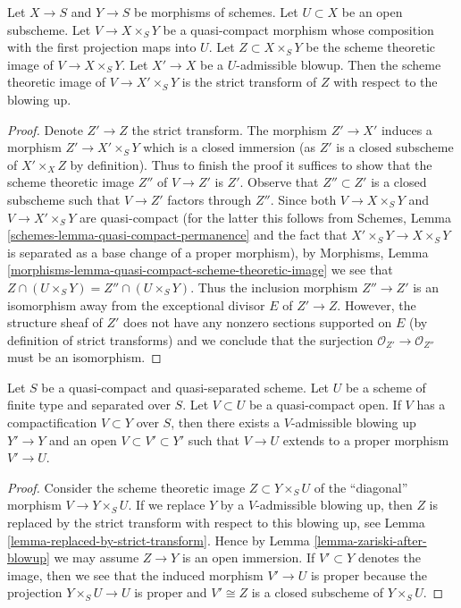 \begin{lemma}
\label{lemma-replaced-by-strict-transform}
Let $X \to S$ and $Y \to S$ be morphisms of schemes.
Let $U \subset X$ be an open subscheme.
Let $V \to X \times_S Y$ be a quasi-compact morphism
whose composition with the first projection maps into $U$.
Let $Z \subset X \times_S Y$ be the scheme theoretic image of
$V \to X \times_S Y$. Let $X' \to X$ be a $U$-admissible blowup.
Then the scheme theoretic image of $V \to X' \times_S Y$ is the
strict transform of $Z$ with respect to the blowing up.
\end{lemma}

\begin{proof}
Denote $Z' \to Z$ the strict transform. The morphism $Z' \to X'$
induces a morphism $Z' \to X' \times_S Y$ which is a closed immersion
(as $Z'$ is a closed subscheme of $X' \times_X Z$ by definition).
Thus to finish the proof it suffices to show that the scheme theoretic
image $Z''$ of $V \to Z'$ is $Z'$. Observe that $Z'' \subset Z'$
is a closed subscheme such that $V \to Z'$ factors through $Z''$.
Since both $V \to X \times_S Y$ and $V \to X' \times_S Y$ are
quasi-compact (for the latter this follows from Schemes, Lemma
\ref{schemes-lemma-quasi-compact-permanence}
and the fact that $X' \times_S Y \to X \times_S Y$ is separated
as a base change of a proper morphism), by Morphisms, Lemma
\ref{morphisms-lemma-quasi-compact-scheme-theoretic-image}
we see that $Z \cap (U \times_S Y) = Z'' \cap (U \times_S Y)$.
Thus the inclusion morphism $Z'' \to Z'$ is an isomorphism
away from the exceptional divisor $E$ of $Z' \to Z$. However, the
structure sheaf of $Z'$ does not have any nonzero sections supported
on $E$ (by definition of strict transforms) and we conclude that
the surjection $\mathcal{O}_{Z'} \to \mathcal{O}_{Z''}$
must be an isomorphism.
\end{proof}

\begin{lemma}
\label{lemma-compactification-dominates}
Let $S$ be a quasi-compact and quasi-separated scheme. Let $U$ be a
scheme of finite type and separated over $S$. Let $V \subset U$ be a
quasi-compact open. If $V$ has a compactification $V \subset Y$
over $S$, then there exists a $V$-admissible blowing up $Y' \to Y$ and an
open $V \subset V' \subset Y'$ such that $V \to U$
extends to a proper morphism $V' \to U$.
\end{lemma}

\begin{proof}
Consider the scheme theoretic image $Z \subset Y \times_S U$
of the ``diagonal'' morphism $V \to Y \times_S U$. If we replace
$Y$ by a $V$-admissible blowing up, then $Z$ is replaced by
the strict transform with respect to this blowing up, see
Lemma \ref{lemma-replaced-by-strict-transform}. Hence by
Lemma \ref{lemma-zariski-after-blowup} we may assume $Z \to Y$
is an open immersion. If $V' \subset Y$ denotes the image, then we
see that the induced morphism $V' \to U$ is proper because the
projection $Y \times_S U \to U$ is proper and $V' \cong Z$
is a closed subscheme of $Y \times_S U$.
\end{proof}

